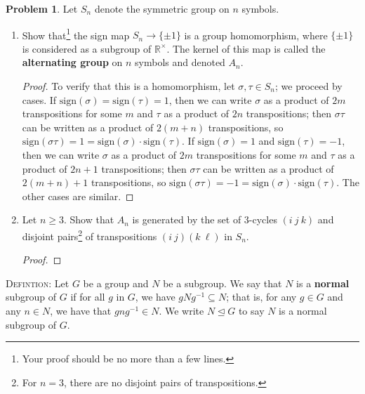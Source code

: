 \documentclass[11pt]{article}
\theoremstyle{definition}
\newtheorem{problem}{Problem}
\begin{document}
\begin{problem} 
Let $S_n$ denote the symmetric group on $n$ symbols.
\begin{enumerate}[(3.1)]
\item Show that\footnote{Your proof should be no more than a few lines.} the sign map $S_n \to \{\pm 1\}$ is a group homomorphism, where $\{\pm 1\}$ is considered as a subgroup of $\mathbb{R}^\times$. The kernel of this map is called the \textbf{alternating group} on $n$ symbols and denoted $A_n$.

\begin{proof} To verify that this is a homomorphism, let $\sigma, \tau\in S_n$; we proceed by cases. If $\mathrm{sign}(\sigma) = \mathrm{sign}(\tau)= 1$, then we can write $\sigma$ as a product of $2m$ transpositions for some $m$ and $\tau$ as a product of $2n$ transpositions; then $\sigma \tau$ can be written as a product of $2(m+n)$ transpositions, so $\mathrm{sign}(\sigma\tau) = 1 = \mathrm{sign}(\sigma) \cdot \mathrm{sign}(\tau)$. If $\mathrm{sign}(\sigma) = 1$ and $\mathrm{sign}(\tau)=-1$, then  we can write $\sigma$ as a product of $2m$ transpositions for some $m$ and $\tau$ as a product of $2n+1$ transpositions; then $\sigma \tau$ can be written as a product of $2(m+n)+1$ transpositions, so $\mathrm{sign}(\sigma\tau) = -1 = \mathrm{sign}(\sigma) \cdot \mathrm{sign}(\tau)$. The other cases are similar.
\end{proof}




\item Let $n\geq 3$. Show that $A_n$ is generated by the set of $3$-cycles $(i \ j\ k)$ and disjoint pairs\footnote{For $n=3$, there are no disjoint pairs of transpositions.} of transpositions $(i \ j) (k \ \ell)$ in $S_n$. 

\begin{proof} 


\end{proof}

\end{enumerate}
\end{problem} 

\smallskip


\noindent \textsc{Defintion:} Let $G$ be a group and $N$ be a subgroup. We say that $N$ is a \textbf{normal} subgroup of $G$ if for all $g$ in $G$, we have $gNg^{-1} \subseteq N$; that is, for any $g\in G$ and any $n\in N$, we have that $gng^{-1}\in N$. We write $N \trianglelefteq G$ to say $N$ is a normal subgroup of $G$.
\end{document}
